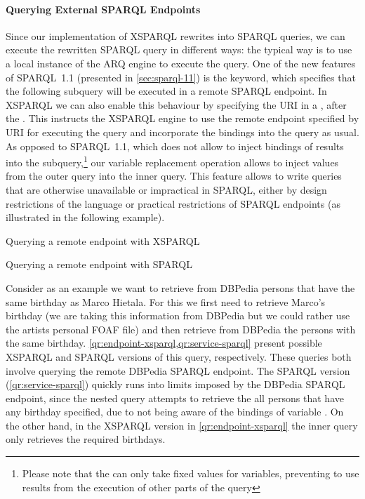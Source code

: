\paragraph*{Querying External SPARQL Endpoints}
\label{sec:external-endpoint}
%
Since our implementation of XSPARQL rewrites  into SPARQL queries, we can execute the rewritten
SPARQL query in different ways: the typical way is to use a local instance of the ARQ engine to execute the query.
%
One of the new features of SPARQL~1.1 (presented in \cref{sec:sparql-11}) is the  keyword, which
specifies that the following subquery will be executed in a remote SPARQL endpoint.  
%
In XSPARQL we can also enable this behaviour by specifying the  \ac{URI} in a \SparqlForClause, after the
\DatasetClause.  This instructs the XSPARQL engine to use the remote endpoint specified by \ac{URI} for executing the
query and incorporate the bindings into the query as usual.
%
As opposed to SPARQL~1.1, which does not allow to inject bindings of results into the 
subquery,\footnote{Please note that the  can only take fixed values for variables, preventing to use
  results from the execution of other parts of the query} our variable replacement operation allows to inject values
from the outer query into the inner query.
%
This feature allows to write queries that are otherwise unavailable or impractical in SPARQL, either by design
restrictions of the language or practical restrictions of SPARQL endpoints (as illustrated in the following example).
%
\begin{query}[t]
  
  \caption{Querying a remote endpoint with XSPARQL}
  \label{qr:endpoint-xsparql}
\end{query}
%
\begin{query}[t]
  
  \caption{Querying a remote endpoint with SPARQL}
  \label{qr:service-sparql}
\end{query}
%
\begin{example}
  Consider as an example we want to retrieve from DBPedia persons that have the same birthday as Marco Hietala.  For
  this we first need to retrieve Marco's birthday (we are taking this information from DBPedia but we could rather use
  the artists personal \ac{FOAF} file) and then retrieve from DBPedia the persons with the same birthday.
  \cref{qr:endpoint-xsparql,qr:service-sparql} present possible XSPARQL and SPARQL versions of this query, respectively.
  These queries both involve querying the remote DBPedia SPARQL endpoint.
  The SPARQL version (\cref{qr:service-sparql}) quickly runs into limits imposed by the DBPedia SPARQL endpoint, since
  the  nested query attempts to retrieve the all persons that have any birthday specified, due to not
  being aware of the bindings of variable .
  On the other hand, in the XSPARQL version in \cref{qr:endpoint-xsparql} the inner  query only
  retrieves the required birthdays.
\end{example}


